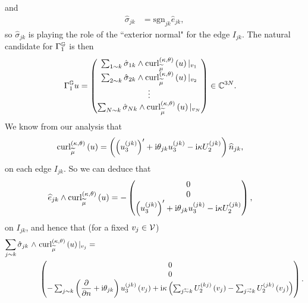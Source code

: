 \documentclass[11pt]{report}
\newcommand{\ktdcurl}[2]{\mathrm{curl}^{\kt}_{#1}\bracs{#2}}
\newcommand{\ngmap}{\nmap^{\graph}}
\newcommand{\sgn}{\mathrm{sgn}}
\begin{document}
and 
\begin{align*}
	\hat{\sigma}_{jk} &= \sgn_{jk}\widehat{e}_{jk},
\end{align*}
so $\hat{\sigma}_{jk}$ is playing the role of the ``exterior normal" for the edge $I_{jk}$.
The natural candidate for $\ngmap$ is then 
\begin{align} \label{eq:NGMapDef}
	\ngmap u &= 
	\begin{pmatrix}
		\sum_{1\con k} \hat{\sigma}_{1k}\wedge\ktdcurl{\dddmes}{u}\vert_{v_1} \\
		\sum_{2\con k} \hat{\sigma}_{2k}\wedge\ktdcurl{\dddmes}{u}\vert_{v_2} \\
		\vdots \\
		\sum_{N\con k} \hat{\sigma}_{Nk}\wedge\ktdcurl{\dddmes}{u}\vert_{v_N}
	\end{pmatrix}
	\in\complex^{3N}.
\end{align}
We know from our analysis that
\begin{align*}
	\ktdcurl{\dddmes}{u} &= \bracs{ \bracs{ u_3^{(jk)} }' + \rmi\qm_{jk}u_3^{(jk)} - \rmi\wavenumber U_2^{(jk)} }\widehat{n}_{jk},
\end{align*}
on each edge $I_{jk}$.
So we can deduce that
\begin{align*}
	\widehat{e}_{jk}\wedge\ktdcurl{\dddmes}{u} &= -
	\begin{pmatrix} 
	0 \\
	0 \\
	\bracs{ u_3^{(jk)} }' + \rmi\qm_{jk}u_3^{(jk)} - \rmi\wavenumber U_2^{(jk)}
	\end{pmatrix},
\end{align*}
on $I_{jk}$, and hence that (for a fixed $v_j\in\mathcal{V}$)
\begin{align*}
	\sum_{j\con k} \hat{\sigma}_{jk} \ \wedge \ &\ktdcurl{\dddmes}{u}\vert_{v_j} = \\ 
	&\begin{pmatrix}
	0 \\
	0 \\	
	- \sum_{j\con k}\bracs{\pdiff{}{n} + \rmi\qm_{jk}}u_3^{(jk)}\bracs{v_j}
	+ \rmi\wavenumber\bracs{ \sum_{j\conRight k} U_2^{(kj)}\bracs{v_j} - \sum_{j\conLeft k} U_2^{(jk)}\bracs{v_j} }
	\end{pmatrix}.
\end{align*}
\end{document}
